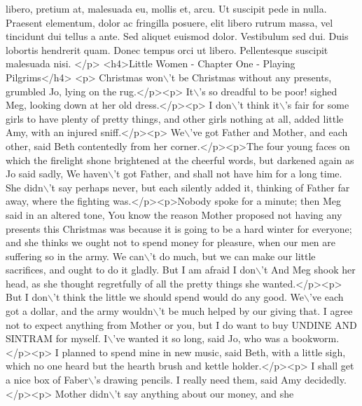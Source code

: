 \begin{DoxyCode}
{       libero, pretium at, malesuada eu, mollis et, arcu. Ut suscipit pede in nulla. Praesent elementum, dolor ac
       fringilla posuere, elit libero rutrum massa, vel tincidunt dui tellus a ante. Sed aliquet euismod dolor.
       Vestibulum sed dui. Duis lobortis hendrerit quam. Donec tempus orci ut libero. Pellentesque suscipit malesuada
       nisi. </p>}
\textcolor{stringliteral}{}
\textcolor{stringliteral}{<h4>Little Women - Chapter One - Playing Pilgrims</h4>}
\textcolor{stringliteral}{}
\textcolor{stringliteral}{<p> Christmas won\(\backslash\)'t be Christmas without any presents,  grumbled Jo, lying on the rug.</p><p> It\(\backslash\)'s so
       dreadful to be poor!  sighed Meg, looking down at her old dress.</p><p> I don\(\backslash\)'t think it\(\backslash\)'s fair for some
       girls to have plenty of pretty things, and other girls nothing at all,  added little Amy, with an injured
       sniff.</p><p> We\(\backslash\)'ve got Father and Mother, and each other,  said Beth contentedly from her corner.</p><p>The four
       young faces on which the firelight shone brightened at the cheerful words, but darkened again as Jo said
       sadly,  We haven\(\backslash\)'t got Father, and shall not have him for a long time.  She didn\(\backslash\)'t say  perhaps never,  but
       each silently added it, thinking of Father far away, where the fighting was.</p><p>Nobody spoke for a
       minute; then Meg said in an altered tone,  You know the reason Mother proposed not having any presents this
       Christmas was because it is going to be a hard winter for everyone; and she thinks we ought not to spend money for
       pleasure, when our men are suffering so in the army. We can\(\backslash\)'t do much, but we can make our little
       sacrifices, and ought to do it gladly. But I am afraid I don\(\backslash\)'t  And Meg shook her head, as she thought regretfully
       of all the pretty things she wanted.</p><p> But I don\(\backslash\)'t think the little we should spend would do any good.
       We\(\backslash\)'ve each got a dollar, and the army wouldn\(\backslash\)'t be much helped by our giving that. I agree not to expect
       anything from Mother or you, but I do want to buy UNDINE AND SINTRAM for myself. I\(\backslash\)'ve wanted it so long, 
       said Jo, who was a bookworm.</p><p> I planned to spend mine in new music,  said Beth, with a little sigh,
       which no one heard but the hearth brush and kettle holder.</p><p> I shall get a nice box of Faber\(\backslash\)'s drawing
       pencils. I really need them,  said Amy decidedly.</p><p> Mother didn\(\backslash\)'t say anything about our money, and she
}
\end{DoxyCode}

